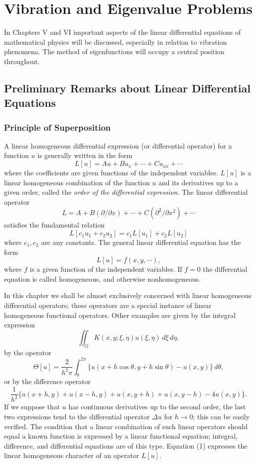 \chapter{Vibration and Eigenvalue Problems}

In Chapters V and VI important aspects of the linear differential equations of mathematical physics will be discussed, especially in relation to vibration phenomena. The method of eigenfunctions will occupy a central position throughout.

\section{Preliminary Remarks about Linear Differential Equations}

\subsection{Principle of Superposition}
A linear homogeneous differential expression (or differential operator) for a function $u$ is generally written in the form
\[
L[u]=Au+Bu_x+\cdots+Cu_{xx}+\cdots
\]
where the coefficients are given functions of the independent variables. $L[u]$ is a linear homogeneous combination of the function $u$ and its derivatives up to a given order, called the \emph{order of the differential expression}. The linear differential operator
\[
L=A+B(\partial/\partial x)+\cdots+C(\partial^2/\partial x^2)+\cdots
\]
satisfies the fundamental relation
\begin{equation}\tag{1}
L[c_1u_1+c_2u_2]=c_1L[u_1]+c_2L[u_2]
\end{equation}
where $c_1,c_2$ are any constants. The general linear differential equation has the form
\[
L[u]=f(x,y,\cdots),
\]
where $f$ is a given function of the independent variables. If $f=0$ the differential equation is called homogeneous, and otherwise nonhomogeneous.

In this chapter we shall be almost exclusively concerned with linear homogeneous differential operators; these operators are a special instance of linear homogeneous functional operators. Other examples are given by the integral expression
\[
\iint_G K(x,y;\xi,\eta)u(\xi,\eta)\,d\xi\,d\eta,
\]
by the operator
\[
\Theta[u]=\frac{2}{h^2\pi}\int_0^{2\pi}\{u(x+h\cos\theta,y+h\sin\theta)-u(x,y)\}\,d\theta,
\]
or by the difference operator
\[
\frac1{h^2}\{u(x+h,y)+u(x-h,y)+u(x,y+h)+u(x,y-h)-4u(x,y)\}.
\]
If we suppose that $u$ has continuous derivatives up to the second order, the last two expressions tend to the differential operator $\Delta u$ for $h\to0$; this can be easily verified. The condition that a linear combination of such linear operators should equal a known function is expressed by a linear functional equation; integral, difference, and differential equations are of this type. Equation (1) expresses the linear homogeneous character of an operator $L[u]$.

